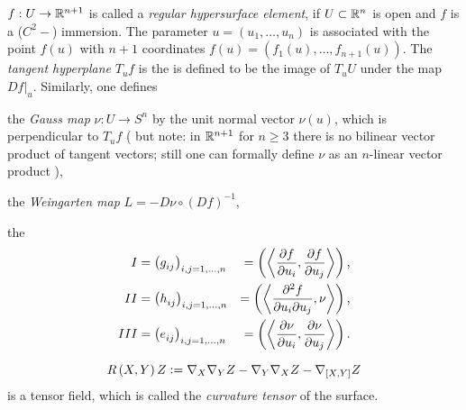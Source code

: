 \documentclass[stu, babel, american, biblatex, a4paper, leqno, draftall]{apa7}
\begin{document}
\begin{definition}\label{Manifold:Hypersurface}
    $f:U\to\mathbb{R}^{n+1}$ is called a \textit{regular hypersurface element},
    if $U\subset\mathbb{R}^n$ is open and $f$ is a ($C^2-$) immersion.
    The parameter $u=\left(u_1,\dots,u_n\right)$ is associated with the point $f(u)$
    with $n+1$ coordinates $f(u)=\left(f_1(u),\dots,f_{n+1}(u)\right)$.
    The \textit{tangent hyperplane} $T_uf$ is the is defined to be the image of $T_uU$ under the map $\left.Df\right|_u$.
    Similarly, one defines
    \begin{APAitemize}
        \item the \textit{Gauss map} $\nu:U\to S^n$ by the unit normal vector $\nu(u)$,
        which is perpendicular to $T_uf$
        (
            but note: in $\mathbb{R}^{n+1}$ for $n\ge3$ there is no bilinear vector product of tangent vectors;
            still one can formally define $\nu$ as an $n$-linear vector product
        ),
        \item the \textit{Weingarten map} $L=-D\nu\circ\left(Df\right)^{-1}$,
        \item the 
        \begin{align*}
            I &= \left(\tensor{g}{_i_j}\right)_{i,j=1,\dots,n} &= \left(\inner{\frac{\partial f}{\partial u_i}}{\frac{\partial f}{\partial u_j}}\right)\text{,} \\
            II &= \left(\tensor{h}{_i_j}\right)_{i,j=1,\dots,n} &= \left(\inner{\frac{\partial^2 f}{\partial u_i\partial u_j}}{\nu}\right)\text{,} \\
            III &= \left(\tensor{e}{_i_j}\right)_{i,j=1,\dots,n} &= \left(\inner{\frac{\partial \nu}{\partial u_i}}{\frac{\partial \nu}{\partial u_j}}\right)\text{.} \\
        \end{align*}
    \end{APAitemize}
\end{definition}
\begin{definition}\label{Manifold:CurvatureTensor}
    \begin{equation*}
        R\left(X,Y\right)Z
        \vcentcolon=
        \nabla_X\nabla_YZ - \nabla_Y\nabla_XZ - \nabla_{\left[{X},{Y}\right]}Z
    \end{equation*}
    is a tensor field, which is called the \textit{curvature tensor} of the surface.
\end{definition}
\end{document}
